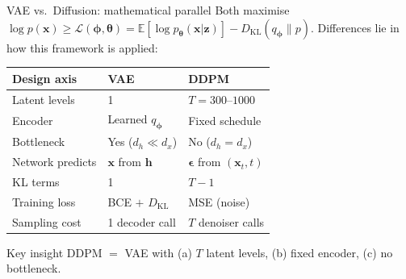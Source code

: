 \documentclass[aspectratio=169,11pt]{beamer}
\newcommand{\E}{\mathbb{E}}
\newcommand{\DKL}{D_{\mathrm{KL}}}
\newcommand{\ELBO}{\mathcal{L}}
\newcommand{\bx}{\bm{x}}
\newcommand{\bh}{\bm{h}}
\newcommand{\bz}{\bm{z}}
\newcommand{\beps}{\bm{\epsilon}}
\newcommand{\btheta}{\bm{\theta}}
\newcommand{\bphi}{\bm{\phi}}
\begin{document}
\begin{frame}{VAE vs.\ Diffusion: mathematical parallel}
\small
Both maximise $\log p(\bx)\geq\ELBO(\bphi,\btheta)
=\E[\log p_{\btheta}(\bx|\bz)]-\DKL(q_{\bphi}\|p)$.
Differences lie in how this framework is applied:

\begin{center}
\renewcommand{\arraystretch}{1.15}
\begin{tabular}{lll}
\toprule
\textbf{Design axis} & \textbf{VAE} & \textbf{DDPM}\\
\midrule
Latent levels    & 1                    & $T = 300$--$1000$\\
Encoder          & Learned $q_{\bphi}$  & Fixed schedule\\
Bottleneck       & Yes ($d_h\ll d_x$)   & No ($d_h = d_x$)\\
Network predicts & $\bx$ from $\bh$     & $\beps$ from $(\bx_t,t)$\\
KL terms         & 1                    & $T-1$\\
Training loss    & BCE $+$ $\DKL$       & MSE (noise)\\
Sampling cost    & 1 decoder call       & $T$ denoiser calls\\
\bottomrule
\end{tabular}
\end{center}

\begin{block}{Key insight}
DDPM $=$ VAE with (a) $T$ latent levels, (b) fixed encoder, (c) no bottleneck.
\end{block}
\end{frame}
\end{document}
